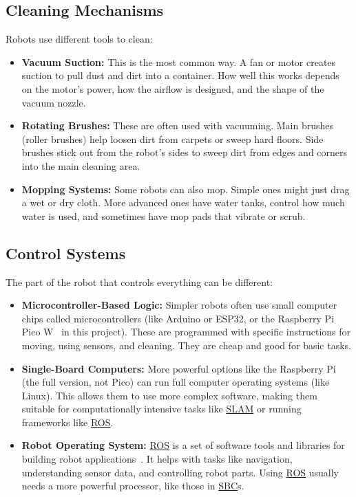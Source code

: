 \subsection*{Cleaning Mechanisms}
Robots use different tools to clean:
\begin{itemize}
    \item \textbf{Vacuum Suction:} This is the most common way. A fan or motor creates suction to pull dust and dirt into a container. How well this works depends on the motor's power, how the airflow is designed, and the shape of the vacuum nozzle.
    \item \textbf{Rotating Brushes:} These are often used with vacuuming. Main brushes (roller brushes) help loosen dirt from carpets or sweep hard floors. Side brushes stick out from the robot's sides to sweep dirt from edges and corners into the main cleaning area.
    \item \textbf{Mopping Systems:} Some robots can also mop. Simple ones might just drag a wet or dry cloth. More advanced ones have water tanks, control how much water is used, and sometimes have mop pads that vibrate or scrub.
\end{itemize}

\subsection*{Control Systems}
The part of the robot that controls everything can be different:
\begin{itemize}
    \item \textbf{Microcontroller-Based Logic:} Simpler robots often use small computer chips called microcontrollers (like Arduino or ESP32, or the Raspberry Pi Pico W~\cite{PicoWDatasheet} in this project). These are programmed with specific instructions for moving, using sensors, and cleaning. They are cheap and good for basic tasks.
    \item \textbf{Single-Board Computers:} More powerful options like the Raspberry Pi (the full version, not Pico) can run full computer operating systems (like Linux). This allows them to use more complex software, making them suitable for computationally intensive tasks like \hyperref[term:slam]{SLAM} or running frameworks like \hyperref[term:ros]{ROS}.
    \item \textbf{Robot Operating System:} \hyperref[term:ros]{ROS} is a set of software tools and libraries for building robot applications~\cite{ROSWiki}. It helps with tasks like navigation, understanding sensor data, and controlling robot parts. Using \hyperref[term:ros]{ROS} usually needs a more powerful processor, like those in \hyperref[term:sbc]{SBC}s.
\end{itemize}


